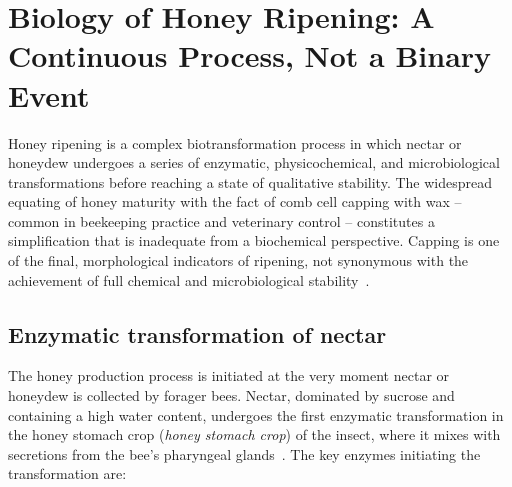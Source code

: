 
\section{Biology of Honey Ripening: A Continuous Process, Not a Binary Event}

Honey ripening is a complex biotransformation process in which
nectar or honeydew undergoes a series of enzymatic, physicochemical,
and microbiological transformations before reaching a state of
qualitative stability. The widespread equating of honey maturity
with the fact of comb cell capping with wax -- common in beekeeping
practice and veterinary control -- constitutes a simplification that
is inadequate from a biochemical perspective. Capping is one of the
final, morphological indicators of ripening, not synonymous with the
achievement of full chemical and microbiological
stability~\cite{zhang2021,sun2021}.

\subsection{Enzymatic transformation of nectar}

The honey production process is initiated at the very moment nectar
or honeydew is collected by forager bees. Nectar, dominated by
sucrose and containing a high water content, undergoes the first
enzymatic transformation in the honey stomach crop (\textit{honey
stomach crop}) of the insect, where it mixes with secretions
from the bee's pharyngeal
glands~\cite{biochemreactions2022}. The key enzymes initiating
the transformation are:

